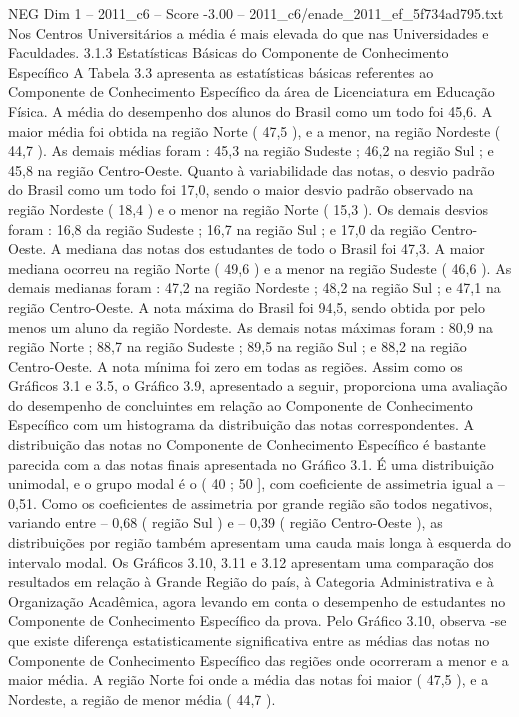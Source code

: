 \begin{textsample}{NEG Dim 1 – 2011\_c6 – Score -3.00 – 2011\_c6/enade\_2011\_ef\_5f734ad795.txt}
Nos Centros Universitários a média é mais elevada do que nas Universidades e Faculdades. 3.1.3 Estatísticas Básicas do Componente de Conhecimento Específico A Tabela 3.3 apresenta as estatísticas básicas referentes ao Componente de Conhecimento Específico da área de Licenciatura em Educação Física.
A média do desempenho dos alunos do Brasil como um todo foi 45,6.
A maior média foi obtida na região Norte ( 47,5 ), e a menor, na região Nordeste ( 44,7 ).
As demais médias foram : 45,3 na região Sudeste ; 46,2 na região Sul ; e 45,8 na região Centro-Oeste.
Quanto à variabilidade das notas, o desvio padrão do Brasil como um todo foi 17,0, sendo o maior desvio padrão observado na região Nordeste ( 18,4 ) e o menor na região Norte ( 15,3 ).
Os demais desvios foram : 16,8 da região Sudeste ; 16,7 na região Sul ; e 17,0 da região Centro-Oeste.
A mediana das notas dos estudantes de todo o Brasil foi 47,3.
A maior mediana ocorreu na região Norte ( 49,6 ) e a menor na região Sudeste ( 46,6 ).
As demais medianas foram : 47,2 na região Nordeste ; 48,2 na região Sul ; e 47,1 na região Centro-Oeste.
A nota máxima do Brasil foi 94,5, sendo obtida por pelo menos um aluno da região Nordeste.
As demais notas máximas foram : 80,9 na região Norte ; 88,7 na região Sudeste ; 89,5 na região Sul ; e 88,2 na região Centro-Oeste.
A nota mínima foi zero em todas as regiões.
Assim como os Gráficos 3.1 e 3.5, o Gráfico 3.9, apresentado a seguir, proporciona uma avaliação do desempenho de concluintes em relação ao Componente de Conhecimento Específico com um histograma da distribuição das notas correspondentes.
A distribuição das notas no Componente de Conhecimento Específico é bastante parecida com a das notas finais apresentada no Gráfico 3.1.
É uma distribuição unimodal, e o grupo modal é o ( 40 ; 50 ], com coeficiente de assimetria igual a – 0,51.
Como os coeficientes de assimetria por grande região são todos negativos, variando entre – 0,68 ( região Sul ) e – 0,39 ( região Centro-Oeste ), as distribuições por região também apresentam uma cauda mais longa à esquerda do intervalo modal.
Os Gráficos 3.10, 3.11 e 3.12 apresentam uma comparação dos resultados em relação à Grande Região do país, à Categoria Administrativa e à Organização Acadêmica, agora levando em conta o desempenho de estudantes no Componente de Conhecimento Específico da prova.
Pelo Gráfico 3.10, observa -se que existe diferença estatisticamente significativa entre as médias das notas no Componente de Conhecimento Específico das regiões onde ocorreram a menor e a maior média.
A região Norte foi onde a média das notas foi maior ( 47,5 ), e a Nordeste, a região de menor média ( 44,7 ).

\end{textsample}
